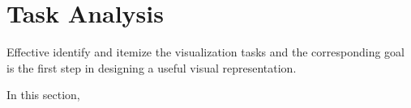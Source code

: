\section{Task Analysis}
\label{sec:task}
Effective identify and itemize the visualization tasks and the corresponding goal is the first step in designing a useful visual representation.

In this section,
